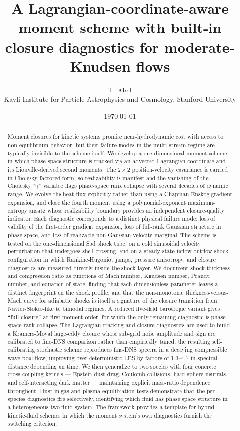 \documentclass[11pt,letterpaper]{article}
\title{A Lagrangian-coordinate-aware moment scheme with built-in closure diagnostics for moderate-Knudsen flows}
\author{T. Abel\\
\small Kavli Institute for Particle Astrophysics and Cosmology, Stanford University}
\date{\today}
\begin{document}
\maketitle

\begin{abstract}
Moment closures for kinetic systems promise near-hydrodynamic cost with access to non-equilibrium behavior, but their failure modes in the multi-stream regime are typically invisible to the scheme itself. We develop a one-dimensional moment scheme in which phase-space structure is tracked via an advected Lagrangian coordinate and its Liouville-derived second moments. The $2\times 2$ position-velocity covariance is carried in Cholesky factored form, so realizability is manifest and the vanishing of the Cholesky ``$\gamma$'' variable flags phase-space rank collapse with several decades of dynamic range. We evolve the heat flux explicitly rather than using a Chapman-Enskog gradient expansion, and close the fourth moment using a polynomial-exponent maximum-entropy ansatz whose realizability boundary provides an independent closure-quality indicator. Each diagnostic corresponds to a distinct physical failure mode: loss of validity of the first-order gradient expansion, loss of full-rank Gaussian structure in phase space, and loss of realizable non-Gaussian velocity marginal. The scheme is tested on the one-dimensional Sod shock tube, on a cold sinusoidal velocity perturbation that undergoes shell crossing, and on a steady-state inflow-outflow shock configuration in which Rankine-Hugoniot jumps, pressure anisotropy, and closure diagnostics are measured directly inside the shock layer. We document shock thickness and compression ratio as functions of Mach number, Knudsen number, Prandtl number, and equation of state, finding that each dimensionless parameter leaves a distinct fingerprint on the shock profile, and that the non-monotonic thickness-versus-Mach curve for adiabatic shocks is itself a signature of the closure transition from Navier-Stokes-like to bimodal regimes. A reduced five-field barotropic variant gives ``full closure'' at first-moment order, for which the only remaining diagnostic is phase-space rank collapse. The Lagrangian tracking and closure diagnostics are used to build a Kramers-Moyal large-eddy closure whose sub-grid noise amplitude and sign are calibrated to fine-DNS comparison rather than empirically tuned; the resulting self-calibrating stochastic scheme reproduces fine-DNS spectra in a decaying compressible wave-pool flow, improving over deterministic LES by factors of 1.3--4.7 in spectral distance depending on time. We then generalize to two species with four concrete cross-coupling kernels --- Epstein dust drag, Coulomb collisions, hard-sphere neutrals, and self-interacting dark matter --- maintaining explicit mass-ratio dependence throughout. Dust-in-gas and plasma-equilibration tests demonstrate that the per-species diagnostics fire selectively, identifying which fluid has phase-space structure in a heterogeneous two-fluid system. The framework provides a template for hybrid kinetic-fluid schemes in which the moment system's own diagnostics furnish the switching criterion.
\end{abstract}
\end{document}
